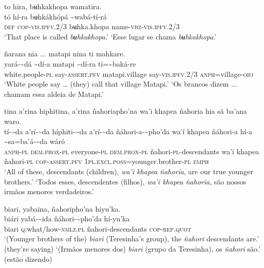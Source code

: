 \documentclass[output=paper,
modfonts,nonflat
]{langsci/langscibook}
\begin{document}
\ea to hira, bʉhkakhopa wamatira.  \\[.3em]
\gll tó	hí-ra	bʉhkákhópá	{\textasciitilde}wabá-tí-rá \\
     \textsc{def}	\textsc{cop-}\textsc{vis.ipfv.}2/3	bʉhka.khopa	name-\textsc{vbz-vis.ipfv.}2/3 \\
\glt ‘That place is called \textit{bʉhkakhopa}.’
\glt ‘Esse lugar se chama \textit{bʉhkakhopa}.’
\z 
 
\ea ñarana nia ... matapi nina ti mahkare. \\[.3em]
\gll {\textasciitilde}yará-{\textasciitilde}dá	{\textasciitilde}dí-a	matapi	{\textasciitilde}dí-ra	ti={\textasciitilde}baká-re\\
     white.people-\textsc{pl}	say-\textsc{assert.pfv}	matapi.village	say-\textsc{vis.ipfv.}2/3	\textsc{anph}=village{\footnotemark}\textsc{-obj}  \\
\glt ‘White people say … (they) call that village Matapi.’
\glt ‘Os brancos dizem ... chamam essa aldeia de Matapi.’
\z 

\ea tina a’rina hiphitina, a’rina ñahoriapho'na wa'i khapea ñahoria hia sã ba'ana waro. \\[.3em]
\gll tí-{\textasciitilde}da	a’rí-{\textasciitilde}da	híphiti-{\textasciitilde}da	a’rí-{\textasciitilde}da	ñáhori-a-{\textasciitilde}pho'da wa'í khapea ñáhori-a	hí-a	{\textasciitilde}sa=ba'á-{\textasciitilde}da	wáró \\
     \textsc{anph-pl}	\textsc{dem.prox-pl}	everyone-\textsc{pl}	\textsc{dem.prox-pl}	ñahori{\footnotemark}-\textsc{pl}-descendants wa’i khapea ñahori-\textsc{pl} 	\textsc{cop-assert.pfv}	1\textsc{pl.excl.poss}=younger.brother-\textsc{pl}	\textsc{emph}\\
\glt ‘All of these, descendants (children), \textit{wa'i khapea ñahoria}, are our true younger brothers.’
\glt ‘Todos esses, descendentes (filhos), \textit{wa'i khapea ñahoria}, são nossos irmãos menores verdadeiros.’
\z 

\ea biari, yabaina, ñahoripho'na hiyu'ka. \\[.3em]
\gll biári	yabá-{\textasciitilde}ida	ñáhori-{\textasciitilde}pho'da	hí-yu'ka \\
     biari 	\textsc{q:}what/how-\textsc{nmlz.pl}	ñahori-descendants	\textsc{cop-rep.quot} \\
\glt ‘(Younger brothers of the) \textit{biari} (Teresinha’s group), the \textit{ñahori} descendants are.’ (they’re saying)
\glt ‘(Irmãos menores dos) \textit{biari} (grupo da Teresinha), os \textit{ñahori} são.’ (estão dizendo)
\z
\end{document}

